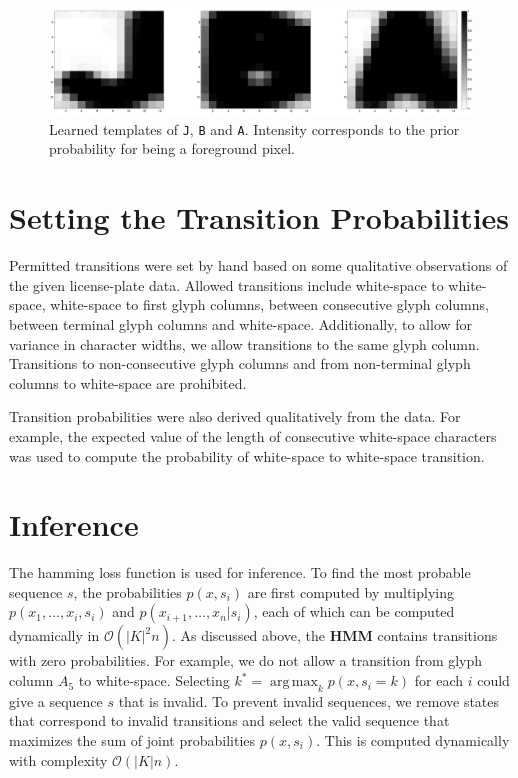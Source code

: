 \documentclass[a4paper,12pt]{article}
\DeclareMathOperator*{\argmax}{arg\,max}
\begin{document}
\begin{figure}[htp]
\centering
\includegraphics[width=\linewidth]{pics/jba.png}
\caption{Learned templates of \texttt{J}, \texttt{B} and
  \texttt{A}. Intensity corresponds to the prior probability for being
  a foreground pixel.}
\label{fig:templates}
\end{figure}

\section{Setting the Transition Probabilities}
Permitted transitions were set by hand based on some qualitative
observations of the given license-plate data. Allowed transitions
include white-space to white-space, white-space to first glyph
columns, between consecutive glyph columns, between terminal glyph
columns and white-space. Additionally, to allow for variance in
character widths, we allow transitions to the same glyph
column. Transitions to non-consecutive glyph columns and from
non-terminal glyph columns to white-space are prohibited.

Transition probabilities were also derived qualitatively from the
data. For example, the expected value of the length of consecutive
white-space characters was used to compute the probability of
white-space to white-space transition.

\section{Inference}
The hamming loss function is used for inference.  To find the most
probable sequence $s$, the probabilities $p(x,s_i)$ are first computed
by multiplying $p(x_1,\ldots,x_i,s_i)$ and
$p(x_{i+1},\ldots,x_n|s_i)$, each of which can be computed dynamically
in $\mathcal{O}(|K|^2n)$. As discussed above, the \textbf{HMM}
contains transitions with zero probabilities. For example, we do not
allow a transition from glyph column $A_5$ to white-space. Selecting
$k^*=\argmax_k{p(x,s_i=k)}$ for each $i$ could give a sequence $s$
that is invalid. To prevent invalid sequences, we remove states that
correspond to invalid transitions and select the valid sequence that
maximizes the sum of joint probabilities $p(x,s_i)$. This is computed
dynamically with complexity $\mathcal{O}(|K|n)$.
\end{document}
